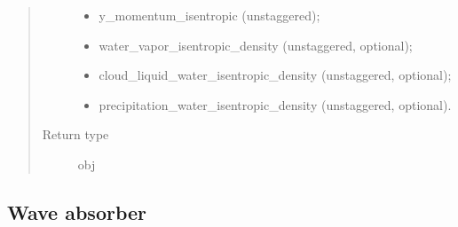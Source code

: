 \documentclass[letterpaper,10pt,english]{sphinxmanual}
\begin{document}
\begin{fulllineitems}
\begin{fulllineitems}
\begin{quote}
\begin{description}
\begin{itemize}
\item {} 
y\_momentum\_isentropic (unstaggered);

\item {} 
water\_vapor\_isentropic\_density (unstaggered, optional);

\item {} 
cloud\_liquid\_water\_isentropic\_density (unstaggered, optional);

\item {} 
precipitation\_water\_isentropic\_density (unstaggered, optional).

\end{itemize}


\item[{Return type}] \leavevmode
obj

\end{description}\end{quote}

\end{fulllineitems}


\end{fulllineitems}



\subsection{Wave absorber}
\label{\detokenize{api:wave-absorber}}
\end{document}
